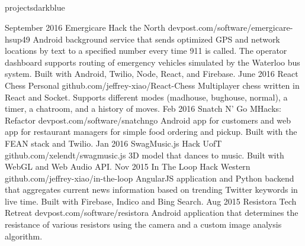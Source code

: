\documentclass{resume}
\begin{document}
\begin{main}
		\section{\faFolder}{projects}{darkblue}
			\begin{entrylist}
				\rightentry%
					{September 2016}%
					{Emergicare}%
					{Hack the North}%
					{devpost.com/software/emergicare-hsup49}%
					{Android background service that sends optimized GPS and network locations by text to a specified number every time 911 is called. The operator dashboard supports routing of emergency vehicles simulated by the Waterloo bus system. Built with Android, Twilio, Node, React, and Firebase.}
				\rightentry%
					{June 2016}%
					{React Chess}%
					{Personal}%
					{github.com/jeffrey-xiao/React-Chess}%
					{Multiplayer chess written in React and Socket. Supports different modes (madhouse, bughouse, normal), a timer, a chatroom, and a history of moves.}
				\rightentry%
					{Feb 2016}%
					{Snatch N' Go}%
					{MHacks: Refactor}%
					{devpost.com/software/snatchngo}%
					{Android app for customers and web app for restaurant managers for simple food ordering and pickup. Built with the FEAN stack and Twilio.}
				\rightentry%
					{Jan 2016}%
					{SwagMusic.js}%
					{Hack UofT}%
					{github.com/xelendt/swagmusic.js}%
					{3D model that dances to music. Built with WebGL and Web Audio API.}
				\rightentry%
					{Nov 2015}%
					{In The Loop}%
					{Hack Western}%
					{github.com/jeffrey-xiao/in-the-loop}%
					{AngularJS application and Python backend that aggregates current news information based on trending Twitter keywords in live time. Built with Firebase, Indico and Bing Search.}
				\rightentry%
					{Aug 2015}%
					{Resistora}%
					{Tech Retreat}%
					{devpost.com/software/resistora}%
					{Android application that determines the resistance of various resistors using the camera and a custom image analysis algorithm.}
			\end{entrylist}	
	\end{main}
\end{document}
